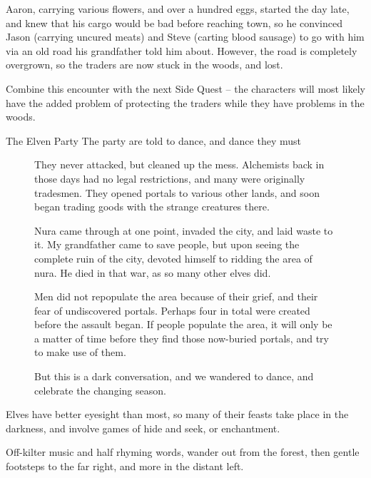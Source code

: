 \begin{multicols}{2}
Aaron, carrying various flowers, and over a hundred eggs, started the day late, and knew that his cargo would be bad before reaching \gls{town}, so he convinced Jason (carrying uncured meats) and Steve (carting blood sausage) to go with him via an old road his grandfather told him about.
However, the road is completely overgrown, so the traders are now stuck in the woods, and lost.

Combine this encounter with the next Side Quest -- the characters will most likely have the added problem of protecting the traders while they have problems in the woods.


{The Elven Party}%
{The party are told to dance, and dance they must}%

\begin{figure*}[b]
\begin{speechtext}

	They never attacked, but cleaned up the mess.  Alchemists back in those days had no legal restrictions, and many were originally tradesmen.  They opened portals to various other lands, and soon began trading goods with the strange creatures there.

	Nura came through at one point, invaded the city, and laid waste to it.  My grandfather came to save people, but upon seeing the complete ruin of the city, devoted himself to ridding the area of nura.  He died in that war, as so many other elves did.

	Men did not repopulate the area because of their grief, and their fear of undiscovered portals.
	Perhaps four in total were created before the assault began.
	If people populate the area, it will only be a matter of time before they find those now-buried portals, and try to make use of them.

	But this is a dark conversation, and we wandered to dance, and celebrate the changing season.

\end{speechtext}
\end{figure*}

Elves have better eyesight than most, so many of their feasts take place in the darkness, and involve games of hide and seek, or enchantment.

\begin{boxtext}

	Off-kilter music and half rhyming words, wander out from the forest, then gentle footsteps to the far right, and more in the distant left.


\end{boxtext}
\end{multicols}
